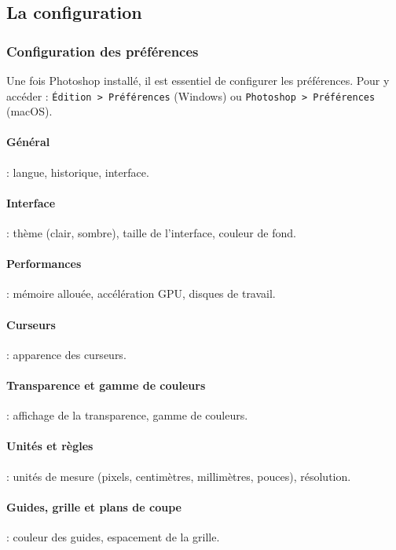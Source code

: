 \subsection{La configuration}

\subsubsection{Configuration des préférences}

Une fois Photoshop installé, il est essentiel de configurer les préférences. Pour y accéder : \texttt{Édition > Préférences} (Windows) ou \texttt{Photoshop > Préférences} (macOS).

\paragraph{Général} : langue, historique, interface.

\paragraph{Interface} : thème (clair, sombre), taille de l'interface, couleur de fond.

\paragraph{Performances} : mémoire allouée, accélération GPU, disques de travail.

\paragraph{Curseurs} : apparence des curseurs.

\paragraph{Transparence et gamme de couleurs} : affichage de la transparence, gamme de couleurs.

\paragraph{Unités et règles} : unités de mesure (pixels, centimètres, millimètres, pouces), résolution.

\paragraph{Guides, grille et plans de coupe} : couleur des guides, espacement de la grille.

